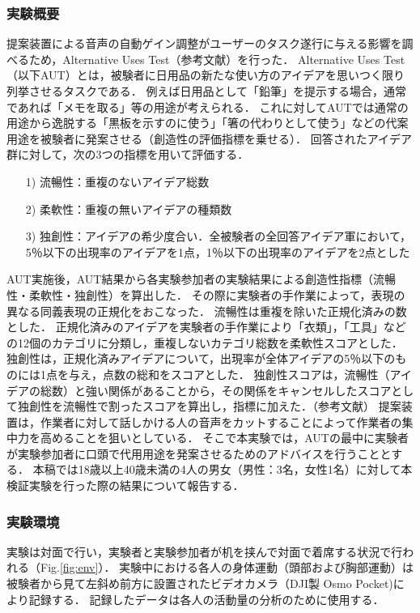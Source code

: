 \documentclass[a4paper]{jarticle}
\begin{document}
\subsubsection{実験概要}
提案装置による音声の自動ゲイン調整がユーザーのタスク遂行に与える影響を調べるため，Alternative Uses Test（参考文献）を行った．
Alternative Uses Test（以下AUT）とは，被験者に日用品の新たな使い方のアイデアを思いつく限り列挙させるタスクである．
例えば日用品として「鉛筆」を提示する場合，通常であれば「メモを取る」等の用途が考えられる．
これに対してAUTでは通常の用途から逸脱する「黒板を示すのに使う」「箸の代わりとして使う」などの代案用途を被験者に発案させる（創造性の評価指標を乗せる）．
回答されたアイデア群に対して，次の3つの指標を用いて評価する．
\begin{enumerate}
    \item[1)]流暢性：重複のないアイデア総数
    \item[2)]柔軟性：重複の無いアイデアの種類数
    \item[3)]独創性：アイデアの希少度合い．全被験者の全回答アイデア軍において，5％以下の出現率のアイデアを1点，1％以下の出現率のアイデアを2点とした
\end{enumerate}
AUT実施後，AUT結果から各実験参加者の実験結果による創造性指標（流暢性・柔軟性・独創性）を算出した．
その際に実験者の手作業によって，表現の異なる同義表現の正規化をおこなった．
流暢性は重複を除いた正規化済みの数とした．
正規化済みのアイデアを実験者の手作業により「衣類」，「工具」などの12個のカテゴリに分類し，重複しないカテゴリ総数を柔軟性スコアとした．
独創性は，正規化済みアイデアについて，出現率が全体アイデアの5％以下のものには1点を与え，点数の総和をスコアとした．
独創性スコアは，流暢性（アイデアの総数）と強い関係があることから，その関係をキャンセルしたスコアとして独創性を流暢性で割ったスコアを算出し，指標に加えた．（参考文献）
提案装置は，作業者に対して話しかける人の音声をカットすることによって作業者の集中力を高めることを狙いとしている．
そこで本実験では，AUTの最中に実験者が実験参加者に口頭で代用用途を発案させるためのアドバイスを行うこととする．
本稿では18歳以上40歳未満の4人の男女（男性：3名，女性1名）に対して本検証実験を行った際の結果について報告する．
\subsubsection{実験環境}
実験は対面で行い，実験者と実験参加者が机を挟んで対面で着席する状況で行われる（Fig.\ref{fig:env}）．
実験中における各人の身体運動（頭部および胸部運動）は被験者から見て左斜め前方に設置されたビデオカメラ（DJI製 Osmo Pocket)により記録する．
記録したデータは各人の活動量の分析のために使用する．
\end{document}
